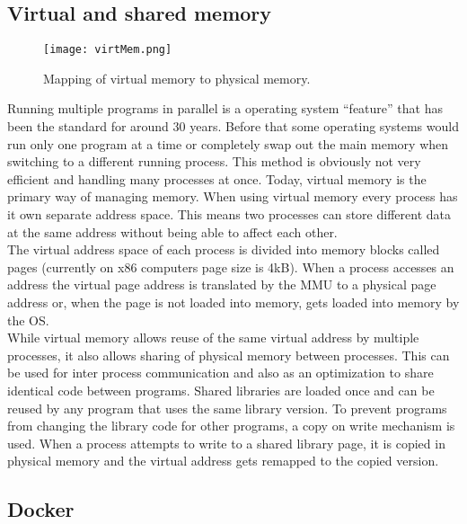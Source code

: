 \documentclass[conference,compsoc,final,a4paper]{IEEEtran}
\begin{document}
\subsection{Virtual and shared memory}
\begin{figure}[!ht]
\centering
\texttt{[image: virtMem.png]}
\caption{Mapping of virtual memory to physical memory. }
\label{virtmem}
\end{figure}
Running multiple programs in parallel is a operating system \enquote{feature} that has been the standard for around 30 years. Before that some operating systems would run only one program at a time or completely swap out the main memory when switching to a different running process. \cite{tanenbaum1997operating} This method is obviously not very efficient and handling many processes at once. Today, virtual memory is the primary way of managing memory. When using virtual memory every process has it own separate address space. This means two processes can store different data at the same address without being able to affect each other. \cite[p.~620]{hennessy2011computer}\\
The virtual address space of each process is divided into memory blocks called pages (currently on x86 computers page size is 4kB). When a process accesses an address the virtual page address is translated by the \ac{MMU} to a physical page address or, when the page is not loaded into memory, gets loaded into memory by the OS. \\
While virtual memory allows reuse of the same virtual address by multiple processes, it also allows sharing of physical memory between processes. This can be used for inter process communication and also as an optimization to share identical code between programs. Shared libraries are loaded once and can be reused by any program that uses the same library version. \cite{tanenbaum1997operating} To prevent programs from changing the library code for other programs, a copy on write mechanism is used. When a process attempts to write to a shared library page, it is copied in physical memory and the virtual address gets remapped to the copied version.
\subsection{Docker}
\end{document}

